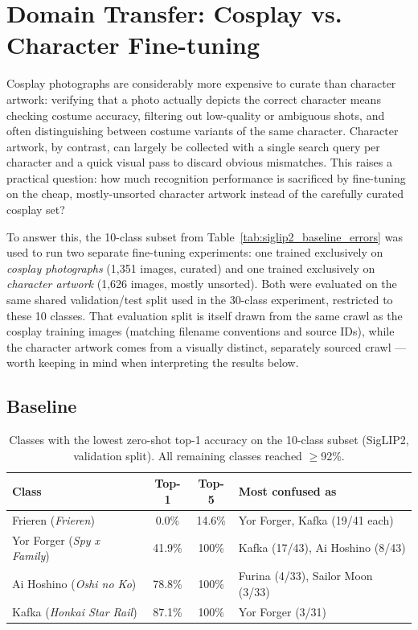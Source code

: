 \section{Domain Transfer: Cosplay vs. Character Fine-tuning}

Cosplay photographs are considerably more expensive to curate than character
artwork: verifying that a photo actually depicts the correct character means
checking costume accuracy, filtering out low-quality or ambiguous shots, and
often distinguishing between costume variants of the same character. Character
artwork, by contrast, can largely be collected with a single search query per
character and a quick visual pass to discard obvious mismatches. This raises
a practical question: how much recognition performance is sacrificed by
fine-tuning on the cheap, mostly-unsorted character artwork instead of the
carefully curated cosplay set?

To answer this, the 10-class subset from Table~\ref{tab:siglip2_baseline_errors}
was used to run two separate fine-tuning experiments: one trained exclusively
on \textit{cosplay photographs} (1{,}351 images, curated) and one trained
exclusively on \textit{character artwork} (1{,}626 images, mostly unsorted).
Both were evaluated on the same shared validation/test split used in the
30-class experiment, restricted to these 10 classes. That evaluation split
is itself drawn from the same crawl as the cosplay training images (matching
filename conventions and source IDs), while the character artwork comes from
a visually distinct, separately sourced crawl --- worth keeping in mind when
interpreting the results below.

\subsection{Baseline}

\begin{table}[H]
\centering
\begin{tabular}{lccl}
\toprule
\textbf{Class} & \textbf{Top-1} & \textbf{Top-5} & \textbf{Most confused as} \\
\midrule
Frieren (\textit{Frieren})            & 0.0\%  & 14.6\% & Yor Forger, Kafka (19/41 each) \\
Yor Forger (\textit{Spy x Family})    & 41.9\% & 100\%  & Kafka (17/43), Ai Hoshino (8/43) \\
Ai Hoshino (\textit{Oshi no Ko})      & 78.8\% & 100\%  & Furina (4/33), Sailor Moon (3/33) \\
Kafka (\textit{Honkai Star Rail})     & 87.1\% & 100\%  & Yor Forger (3/31) \\
\bottomrule
\end{tabular}
\caption{Classes with the lowest zero-shot top-1 accuracy on the 10-class
subset (SigLIP2, validation split). All remaining classes reached
$\geq$92\%.}
\label{tab:domain_baseline_errors}
\end{table}


